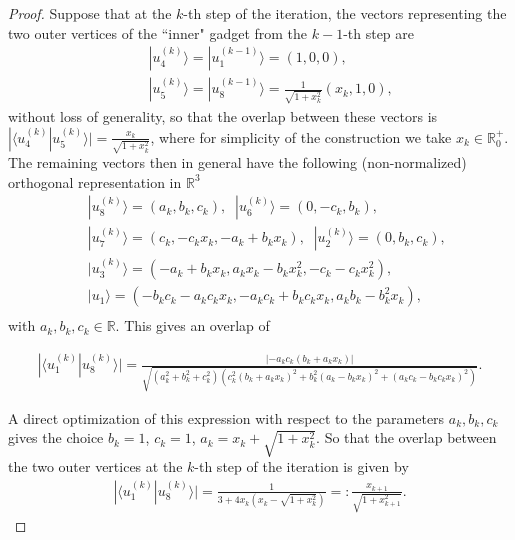 \documentclass[twocolumn, a4paper, superscriptaddress,nofootinbib, accepted=2020-08-07, hyperref]{quantumarticle}
\begin{document}
\begin{proof}
Suppose that at the $k$-th step of the iteration, the vectors representing the two outer vertices of the ``inner" gadget from the $k-1$-th step are 
\begin{eqnarray}
&&|u_4^{(k)} \rangle = |u_1^{(k-1)} \rangle = (1,0,0), \nonumber \\
&&|u_5^{(k)} \rangle = |u_8^{(k-1)} \rangle = \frac{1}{\sqrt{1+x_k^2}}(x_k,1,0),
\end{eqnarray} 
without loss of generality, so that the overlap between these vectors is $| \langle u_4^{(k)} | u_5^{(k)} \rangle| = \frac{x_k}{\sqrt{1+x_k^2}}$, where for simplicity of the construction we take $x_k \in \mathbb{R}^+_0$. The remaining vectors then in general have the following (non-normalized) orthogonal representation in $\mathbb{R}^3$
\begin{eqnarray}
&&|u_8^{(k)} \rangle = (a_k,b_k,c_k), \; \; |u_6^{(k)} \rangle = (0,-c_k,b_k), \nonumber \\
&& |u_7^{(k)} \rangle = (c_k,-c_k x_k, -a_k + b_k x_k), \; \; |u_2^{(k)} \rangle = (0,b_k,c_k), \; \;  \nonumber \\
&&|u_3^{(k)} \rangle = (-a_k + b_k x_k, a_k x_k - b_k x_k^2, -c_k -c_k x_k^2), \nonumber \\
&& |u_1 \rangle = (-b_k c_k- a_k c_k x_k, - a_k c_k + b_k c_k x_k,a_k b_k - b_k^2 x_k), \nonumber \\
\end{eqnarray}
with $a_k,b_k,c_k \in \mathbb{R}$. This gives an overlap of
\begin{widetext}
\begin{eqnarray}
\label{eq:overlap}
| \langle u_1^{(k)} | u_8^{(k)} \rangle | = \frac{|-a_k c_k (b_k + a_k x_k)|}{\sqrt{(a_k^2 + b_k^2 + c_k^2)(c_k^2(b_k + a_k x_k)^2 + b_k^2(a_k - b_k x_k)^2 + (a_k c_k - b_k c_k x_k)^2)}}.
\end{eqnarray}
\end{widetext}
A direct optimization of this expression with respect to the parameters $a_k,b_k,c_k$ gives the choice $b_k=1$, $c_k=1$, $a_k= x_k + \sqrt{1+x_k^2}$. So that the overlap between the two outer vertices at the $k$-th step of the iteration is given by 
\begin{eqnarray}
\label{eq:iter-koverlap}
| \langle u_1^{(k)} | u_8^{(k)} \rangle | = \frac{1}{3+4 x_k(x_k-\sqrt{1+x_k^2})} =: \frac{x_{k+1}}{\sqrt{1+x_{k+1}^2}}.
\end{eqnarray}

\end{proof}
\end{document}
